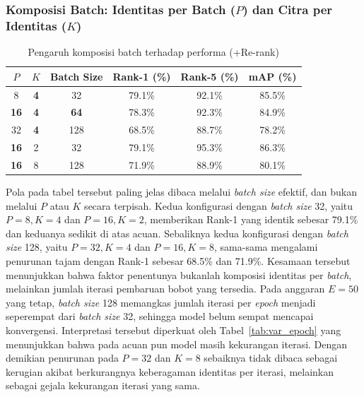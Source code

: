 \subsubsection{Komposisi Batch: Identitas per Batch ($P$) dan Citra per Identitas ($K$)}

\begin{table}[H]
    \centering
    \caption{Pengaruh komposisi batch terhadap performa (+Re-rank)}
    \label{tab:var_batch}
    \renewcommand{\arraystretch}{1.25}
    \begin{tabular}{cccccc}
        \hline
        $P$         & $K$        & \textbf{Batch Size} & \textbf{Rank-1 (\%)} & \textbf{Rank-5 (\%)} & \textbf{mAP (\%)} \\
        \hline
        8           & \textbf{4} & 32                  & 79.1\%               & 92.1\%               & 85.5\%            \\
        \textbf{16} & \textbf{4} & \textbf{64}         & 78.3\%               & 92.3\%               & 84.9\%            \\
        32          & \textbf{4} & 128                 & 68.5\%               & 88.7\%               & 78.2\%            \\
        \textbf{16} & 2          & 32                  & 79.1\%               & 95.3\%               & 86.3\%            \\
        \textbf{16} & 8          & 128                 & 71.9\%               & 88.9\%               & 80.1\%            \\
        \hline
    \end{tabular}
\end{table}

Pola pada tabel tersebut paling jelas dibaca melalui \textit{batch size} efektif, dan bukan melalui $P$ atau $K$ secara terpisah. Kedua konfigurasi dengan \textit{batch size} 32, yaitu $P=8, K=4$ dan $P=16, K=2$, memberikan Rank-1 yang identik sebesar 79.1\% dan keduanya sedikit di atas acuan. Sebaliknya kedua konfigurasi dengan \textit{batch size} 128, yaitu $P=32, K=4$ dan $P=16, K=8$, sama-sama mengalami penurunan tajam dengan Rank-1 sebesar 68.5\% dan 71.9\%. Kesamaan tersebut menunjukkan bahwa faktor penentunya bukanlah komposisi identitas per \textit{batch}, melainkan jumlah iterasi pembaruan bobot yang tersedia. Pada anggaran $E=50$ yang tetap, \textit{batch size} 128 memangkas jumlah iterasi per \textit{epoch} menjadi seperempat dari \textit{batch size} 32, sehingga model belum sempat mencapai konvergensi. Interpretasi tersebut diperkuat oleh Tabel~\ref{tab:var_epoch} yang menunjukkan bahwa pada acuan pun model masih kekurangan iterasi. Dengan demikian penurunan pada $P=32$ dan $K=8$ sebaiknya tidak dibaca sebagai kerugian akibat berkurangnya keberagaman identitas per iterasi, melainkan sebagai gejala kekurangan iterasi yang sama.

